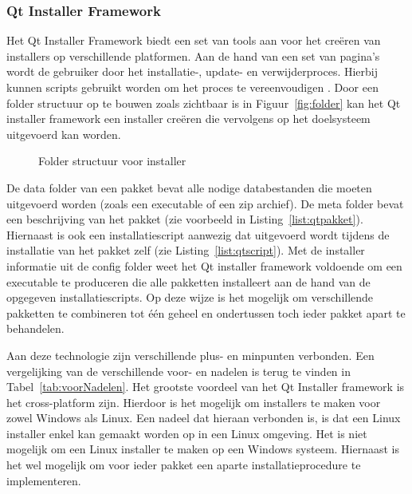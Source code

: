 \subsubsection{Qt Installer Framework}
Het Qt Installer Framework biedt een set van tools aan voor het creëren van installers op verschillende platformen.
Aan de hand van een set van pagina's wordt de gebruiker door het installatie-, update- en verwijderproces.
Hierbij kunnen scripts gebruikt worden om het proces te vereenvoudigen \citep{qtDoc}.
Door een folder structuur op te bouwen zoals zichtbaar is in Figuur~\vref{fig:folder} kan het Qt installer framework een installer creëren die vervolgens op het doelsysteem uitgevoerd kan worden.

\begin{figure}[!ht]
\centering
{}
\caption{Folder structuur voor installer}
\label{fig:folder}
\end{figure}

De data folder van een pakket bevat alle nodige databestanden die moeten uitgevoerd worden (zoals een executable of een zip archief).
De meta folder bevat een beschrijving van het pakket (zie voorbeeld in Listing~\vref{list:qtpakket}).
Hiernaast is ook een installatiescript aanwezig dat uitgevoerd wordt tijdens de installatie van het pakket zelf (zie Listing~\vref{list:qtscript}).
Met de installer informatie uit de config folder weet het Qt installer framework voldoende om een executable te produceren die alle pakketten installeert aan de hand van de opgegeven installatiescripts.
Op deze wijze is het mogelijk om verschillende pakketten te combineren tot één geheel en ondertussen toch ieder pakket apart te behandelen.

Aan deze technologie zijn verschillende plus- en minpunten verbonden.
Een vergelijking van de verschillende voor- en nadelen is terug te vinden in Tabel~\ref{tab:voorNadelen}.
Het grootste voordeel van het Qt Installer framework is het cross-platform zijn.
Hierdoor is het mogelijk om installers te maken voor zowel Windows als Linux.
Een nadeel dat hieraan verbonden is, is dat een Linux installer enkel kan gemaakt worden op in een Linux omgeving.
Het is niet mogelijk om een Linux installer te maken op een Windows systeem.
Hiernaast is het wel mogelijk om voor ieder pakket een aparte installatieprocedure te implementeren.


